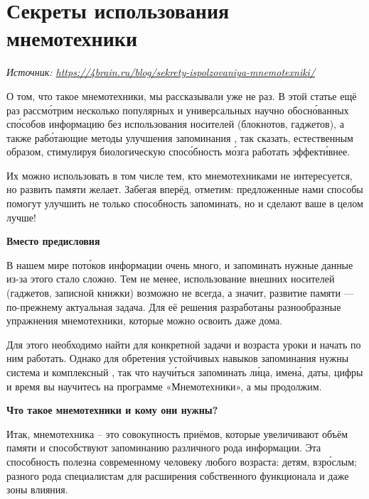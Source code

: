 \newpage
\section{Секреты использования мнемотехники}

\textit{Источник: \url{https://4brain.ru/blog/sekrety-ispolzovaniya-mnemotexniki/}}

О том, что такое мнемотехники, мы рассказывали уже не раз. В этой статье ещё раз рассм\'{о}трим несколько популярных и универсальных научно обосн\'{о}ванных сп\'{о}собов  информацию без использования  носителей (блокнотов, гаджетов), а также раб\'{о}тающие методы улучшения запоминания , так сказать, естественным образом, стимулируя биологическую спос\'{о}бность м\'{о}зга работать эффект\'{и}внее.

Их можно использовать в том числе тем, кто  мнемотехниками не интересуется, но развить  памяти желает. Забегая вперёд, отметим: предложенные нами способы помогут улучшить не только способность запоминать, но и сделают ваше  в целом лучше!

\textbf{Вместо предисловия}

В нашем мире пот\'{о}ков информации очень много,  и запоминать нужные данные из-за этого стало сложно. Тем не менее, использование внешних носителей (гаджетов, записной книжки) возможно не всегда, а значит, развитие памяти --- по-прежнему актуальная задача. Для её решения разработаны разнообразные упражнения мнемотехники, которые можно освоить даже дома.

Для этого необходимо найти  для конкретной задачи и возраста уроки и начать по ним работать. Однако для обретения устойчивых навыков запоминания нужны система и комплексный , так что науч\'{и}ться запоминать л\'{и}ца, имен\'{а}, даты, цифры и время вы научитесь на программе «Мнемотехники», а мы продолжим.

\textbf{Что такое мнемотехники и кому они нужны?}

Итак, мнемотехника – это совокупность приёмов, которые увеличивают объём памяти и способствуют запоминанию различного рода информации. Эта способность полезна современному человеку любого возраста: детям, взр\'{о}слым; разного рода специалистам для расширения собственного функционала и даже зоны влияния.

